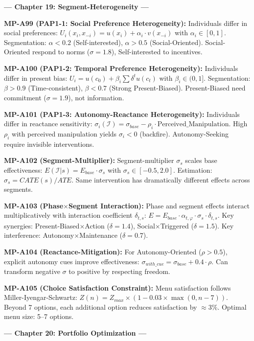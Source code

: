 \begin{tcolorbox}[colback=gray!5!white, colframe=gray!75!black,
    title=\textbf{MP Axioms}]
\textbf{--- Chapter 19: Segment-Heterogeneity ---}

\textbf{MP-A99 (PAP1-1: Social Preference Heterogeneity):} Individuals differ in social preferences: $U_i(x_i, x_{-i}) = u(x_i) + \alpha_i \cdot v(x_{-i})$ with $\alpha_i \in [0,1]$. Segmentation: $\alpha < 0.2$ (Self-interested), $\alpha > 0.5$ (Social-Oriented). Social-Oriented respond to norms ($\sigma = 1.8$), Self-interested to incentives.

\textbf{MP-A100 (PAP1-2: Temporal Preference Heterogeneity):} Individuals differ in present bias: $U_i = u(c_0) + \beta_i \sum \delta^t u(c_t)$ with $\beta_i \in (0,1]$. Segmentation: $\beta > 0.9$ (Time-consistent), $\beta < 0.7$ (Strong Present-Biased). Present-Biased need commitment ($\sigma = 1.9$), not information.

\textbf{MP-A101 (PAP1-3: Autonomy-Reactance Heterogeneity):} Individuals differ in reactance sensitivity: $\sigma_i(\mathcal{I}) = \sigma_{base} - \rho_i \cdot \text{Perceived\_Manipulation}$. High $\rho_i$ with perceived manipulation yields $\sigma_i < 0$ (backfire). Autonomy-Seeking require invisible interventions.

\textbf{MP-A102 (Segment-Multiplier):} Segment-multiplier $\sigma_s$ scales base effectiveness: $E(\mathcal{I}|s) = E_{base} \cdot \sigma_s$ with $\sigma_s \in [-0.5, 2.0]$. Estimation: $\hat{\sigma}_s = CATE(s)/ATE$. Same intervention has dramatically different effects across segments.

\textbf{MP-A103 (Phase$\times$Segment Interaction):} Phase and segment effects interact multiplicatively with interaction coefficient $\delta_{t,s}$: $E = E_{base} \cdot \alpha_{t,\varphi} \cdot \sigma_s \cdot \delta_{t,s}$. Key synergies: Present-Biased$\times$Action ($\delta = 1.4$), Social$\times$Triggered ($\delta = 1.5$). Key interference: Autonomy$\times$Maintenance ($\delta = 0.7$).

\textbf{MP-A104 (Reactance-Mitigation):} For Autonomy-Oriented ($\rho > 0.5$), explicit autonomy cues improve effectiveness: $\sigma_{with\_cue} = \sigma_{base} + 0.4 \cdot \rho$. Can transform negative $\sigma$ to positive by respecting freedom.

\textbf{MP-A105 (Choice Satisfaction Constraint):} Menu satisfaction follows Miller-Iyengar-Schwartz: $Z(n) = Z_{max} \times (1 - 0.03 \times \max(0, n-7))$. Beyond 7 options, each additional option reduces satisfaction by $\approx 3\%$. Optimal menu size: 5--7 options.

\textbf{--- Chapter 20: Portfolio Optimization ---}


\end{tcolorbox}
